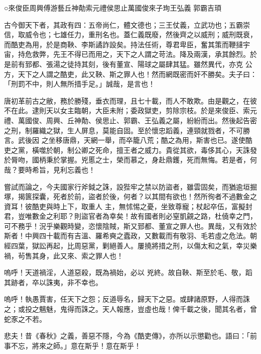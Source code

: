 
\begin{pinyinscope}

 ○來俊臣周興傅游藝丘神勣索元禮侯思止萬國俊來子珣王弘義
 郭霸吉頊



 古今御天下者，其政有四：五帝尚仁，體文德也；三王仗義，立武功也；五霸崇信，取威令也；七雄任力，重刑名也。蓋仁義既廢，然後齊之以威刑；威刑既衰，而酷吏為用，於是商鞅、李斯譎詐設矣。持法任術，尊君卑臣，奮其策而鞭撻宇宙，持危救弊，先王不得已而用之，天下之人謂之苛法。降及兩漢，承其餘烈。於是前有郅都、張湯之徒持其刻，後有董宣、陽球之屬肆其猛。雖然異代，亦克
 公方，天下之人謂之酷吏，此又鞅、斯之罪人也！然而網既密而奸不勝矣。夫子曰：「刑罰不中，則人無所措手足。」誠哉，是言也！



 唐初革前古之敝，務於勝殘，垂衣而理，且七十載，而人不敢欺。由是觀之，在彼不在此。逮則天以女主臨朝，大臣未附；委政獄吏，剪除宗枝。於是來俊臣、索元禮、萬國俊、周興、丘神勣、侯思止、郭霸、王弘義之屬，紛紛而出。然後起告密之刑，制羅織之獄，生人屏息，莫能自固。至於懷忠蹈義，連頸就戮者，不可勝言。武後因
 之坐移唐鼎，天網一舉，而卒籠八荒；酷之為用，斯害也已。遂使酷吏之黨，橫噬於朝，制公卿之死命，擅王者之威力。貴從其欲，毒侈其心，天誅發於脣吻，國柄秉於掌握。兇慝之士，榮而慕之，身赴鼎鑊，死而無悔。若是者，何哉？要時希旨，見利忘義也！



 嘗試而論之，今夫國家行斧鉞之誅，設狴牢之禁以防盜者，雖雲固矣，而猶逾垣掘塚，揭篋探囊，死者於前，盜者於後，何者？以其間有欲也！然所徇者不過數金之資耳！彼酷吏與時上下，取重人
 主，無怵惕之憂，坐致尊寵；杖起卒伍，富擬封君，豈唯數金之利耶？則盜官者為幸矣！故有國者則必窒凱覦之路，杜僥幸之門，可不務乎！況乎樂觀時變，恣懷陰賊，斯又郅都、董宣之罪人也。異哉，又有效於斯者！中興四十載而有吉溫、羅希奭之蠹政，又數載而有敬羽、毛若虛之危法。朝經四葉，獄訟再起，比周惡黨，剿絕善人。屢撓將措之刑，以傷太和之氣，幸災樂禍，茍售其身，此又來、索之罪人也！



 嗚呼！天道禍淫，人道惡殺，既為禍始，必以
 兇終。故自鞅、斯至於毛、敬，蹈其跡者，卒以誅夷，非不幸也。



 嗚呼！執愚賈害，任天下之怨；反道辱名，歸天下之惡。或肆諸原野，人得而誅之；或投之魑魅，鬼得而誅之。天人報應，豈虛也哉！俾千載之後，聞其名者，曾蛇豕之不若。



 悲夫！昔《春秋》之義，善惡不隱，今為《酷吏傳》，亦所以示懲勸也。語曰：「前事不忘，將來之師。」意在斯乎！意在斯乎！




\end{pinyinscope}
